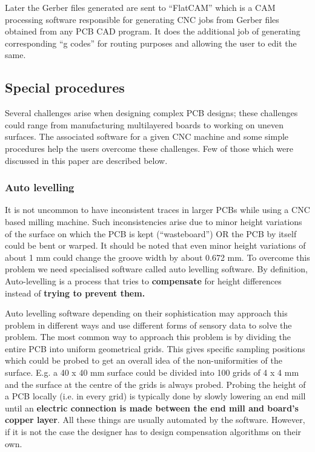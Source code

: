 Later the Gerber files generated are sent to “FlatCAM” which is a CAM processing software responsible for generating CNC jobs from Gerber files obtained from any PCB CAD program. It does the additional job of generating corresponding “g codes” for routing purposes and allowing the user to edit the same.


\subsection{Special procedures} \label{spec_proc}

Several challenges arise when designing complex PCB designs; these challenges could range from manufacturing multilayered boards to working on uneven surfaces. The associated software for a given CNC machine and some simple procedures help the users overcome these challenges. Few of those which were discussed in this paper are described below.

\subsubsection*{Auto levelling}
It is not uncommon to have inconsistent traces in larger PCBs while using a CNC based milling machine. Such inconsistencies arise due to minor height variations of the surface on which the PCB is kept (“wasteboard”) OR the PCB by itself could be bent or warped. It should be noted that even minor height variations of about 1 mm could change the groove width by about 0.672 mm.  To overcome this problem we need specialised software called auto levelling software. By definition, Auto-levelling is a process that tries to \textbf{compensate} for height differences instead of \textbf{trying to prevent them.} \par

Auto levelling software depending on their sophistication may approach this problem in different ways and use different forms of sensory data to solve the problem. The most common way to approach this problem is by dividing the entire PCB into uniform geometrical grids. This gives specific sampling positions which could be probed to get an overall idea of the non-uniformities of the surface. E.g. a 40 x 40 mm surface could be divided into 100 grids of 4 x 4 mm and the surface at the centre of the grids is always probed.  Probing the height of a PCB locally (i.e. in every grid) is typically done by slowly lowering an end mill until an \textbf{electric connection is made between the end mill and board’s copper layer}. All these things are usually automated by the software. However, if it is not the case the designer has to design compensation algorithms on their own. \par


